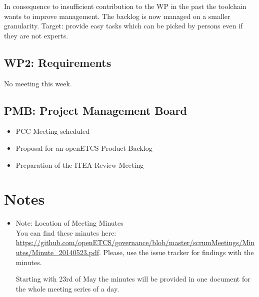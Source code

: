 \documentclass[a4paper, 11pt]{article}
\begin{document}
In consequence to insufficient contribution to the WP in the past the toolchain wants to improve management. The backlog is now managed on a smaller granularity. Target: provide easy tasks which can be picked by persons even if they are not experts.


\subsection{WP2: Requirements}

No meeting this week.

\subsection{PMB: Project Management Board}
\begin{itemize}
\item PCC Meeting scheduled
\item Proposal for an openETCS Product Backlog
\item Preparation of the ITEA Review Meeting

\end{itemize}

\section{Notes}
\begin{itemize}

\item Note: Location of Meeting Minutes\\
You can find these minutes here: \url{https://github.com/openETCS/governance/blob/master/scrumMeetings/Minutes/Minute_20140523.pdf}. Please, use the issue tracker for findings with the minutes.

Starting with 23rd of May the minutes will be provided in one document for the whole meeting series of a day.

\end{itemize}
\end{document}
